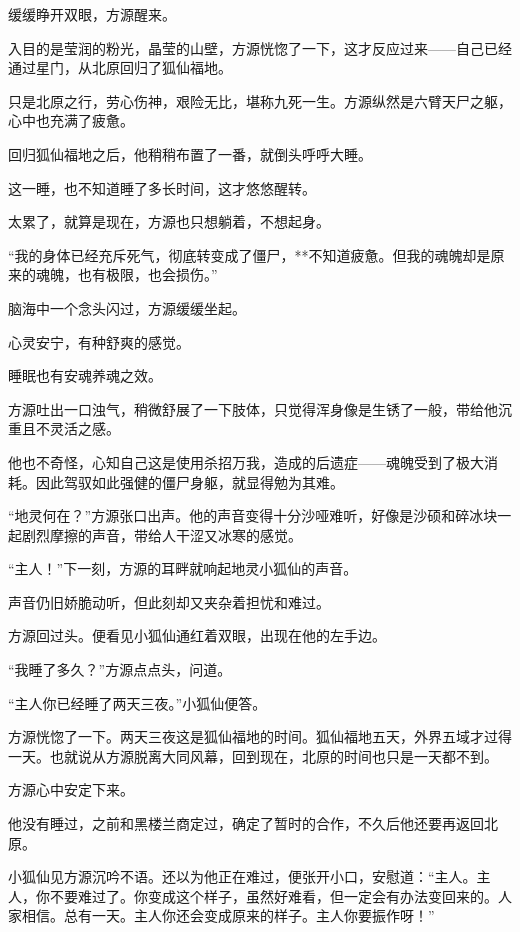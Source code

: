 
\begin{this_body}

缓缓睁开双眼，方源醒来。

入目的是莹润的粉光，晶莹的山壁，方源恍惚了一下，这才反应过来——自己已经通过星门，从北原回归了狐仙福地。

只是北原之行，劳心伤神，艰险无比，堪称九死一生。方源纵然是六臂天尸之躯，心中也充满了疲惫。

回归狐仙福地之后，他稍稍布置了一番，就倒头呼呼大睡。

这一睡，也不知道睡了多长时间，这才悠悠醒转。

太累了，就算是现在，方源也只想躺着，不想起身。

“我的身体已经充斥死气，彻底转变成了僵尸，**不知道疲惫。但我的魂魄却是原来的魂魄，也有极限，也会损伤。”

脑海中一个念头闪过，方源缓缓坐起。

心灵安宁，有种舒爽的感觉。

睡眠也有安魂养魂之效。

方源吐出一口浊气，稍微舒展了一下肢体，只觉得浑身像是生锈了一般，带给他沉重且不灵活之感。

他也不奇怪，心知自己这是使用杀招万我，造成的后遗症——魂魄受到了极大消耗。因此驾驭如此强健的僵尸身躯，就显得勉为其难。

“地灵何在？”方源张口出声。他的声音变得十分沙哑难听，好像是沙硕和碎冰块一起剧烈摩擦的声音，带给人干涩又冰寒的感觉。

“主人！”下一刻，方源的耳畔就响起地灵小狐仙的声音。

声音仍旧娇脆动听，但此刻却又夹杂着担忧和难过。

方源回过头。便看见小狐仙通红着双眼，出现在他的左手边。

“我睡了多久？”方源点点头，问道。

“主人你已经睡了两天三夜。”小狐仙便答。

方源恍惚了一下。两天三夜这是狐仙福地的时间。狐仙福地五天，外界五域才过得一天。也就说从方源脱离大同风幕，回到现在，北原的时间也只是一天都不到。

方源心中安定下来。

他没有睡过，之前和黑楼兰商定过，确定了暂时的合作，不久后他还要再返回北原。

小狐仙见方源沉吟不语。还以为他正在难过，便张开小口，安慰道：“主人。主人，你不要难过了。你变成这个样子，虽然好难看，但一定会有办法变回来的。人家相信。总有一天。主人你还会变成原来的样子。主人你要振作呀！”


\end{this_body}
